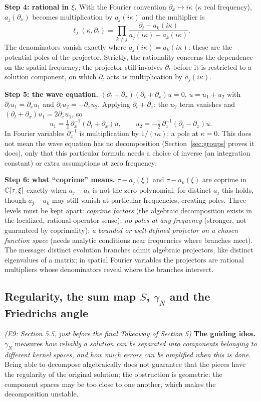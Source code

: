 \medskip\textbf{Step 4: rational in $\xi$.} With the Fourier convention $\partial_x\mapsto i\kappa$ ($\kappa$ real frequency), $a_j(\partial_x)$ becomes multiplication by $a_j(i\kappa)$ and the multiplier is
\[
\ell_j(\kappa,\partial_t)=\prod_{k\ne j}\frac{\partial_t-a_k(i\kappa)}{a_j(i\kappa)-a_k(i\kappa)} .
\]
The denominators vanish exactly where $a_j(i\kappa)=a_k(i\kappa)$: these are the potential poles of the projector. Strictly, the rationality concerns the dependence on the spatial frequency; the projector still involves $\partial_t$ before it is restricted to a solution component, on which $\partial_t$ acts as multiplication by $a_j(i\kappa)$.

\medskip\textbf{Step 5: the wave equation.} $(\partial_t-\partial_x)(\partial_t+\partial_x)u=0$, $u=u_1+u_2$ with $\partial_tu_1=\partial_xu_1$ and $\partial_tu_2=-\partial_xu_2$. Applying $\partial_t+\partial_x$: the $u_2$ term vanishes and $(\partial_t+\partial_x)u_1=2\partial_xu_1$, so
\[
u_1=\tfrac12\,\partial_x^{-1}(\partial_t+\partial_x)u,\qquad u_2=-\tfrac12\,\partial_x^{-1}(\partial_t-\partial_x)u .
\]
In Fourier variables $\partial_x^{-1}$ is multiplication by $1/(i\kappa)$: a pole at $\kappa=0$. This does not mean the wave equation has no decomposition (Section~\ref{sec:groups} proves it does), only that this particular formula needs a choice of inverse (an integration constant) or extra assumptions at zero frequency.

\medskip\textbf{Step 6: what ``coprime'' means.} $\tau-a_j(\xi)$ and $\tau-a_k(\xi)$ are coprime in $\mathbb{C}[\tau,\xi]$ exactly when $a_j-a_k$ is not the zero polynomial; for distinct $a_j$ this holds, though $a_j-a_k$ may still vanish at particular frequencies, creating poles. Three levels must be kept apart: \emph{coprime factors} (the algebraic decomposition exists in the localized, rational-operator sense); \emph{no poles at any frequency} (stronger, not guaranteed by coprimality); \emph{a bounded or well-defined projector on a chosen function space} (needs analytic conditions near frequencies where branches meet). The message: distinct evolution branches admit algebraic projectors, like distinct eigenvalues of a matrix; in spatial Fourier variables the projectors are rational multipliers whose denominators reveal where the branches intersect.

\subsection{Regularity, the sum map $S$, $\gamma_N$ and the Friedrichs angle}\label{expl:E9}
\noindent\emph{(E9: Section 5.5, just before the final Takeaway of Section 5)}
\textbf{The guiding idea.} $\gamma_N$ measures \emph{how reliably a solution can be separated into components belonging to different kernel spaces, and how much errors can be amplified when this is done}. Being able to decompose algebraically does not guarantee that the pieces have the regularity of the original solution; the obstruction is geometric: the component spaces may be too close to one another, which makes the decomposition unstable.

